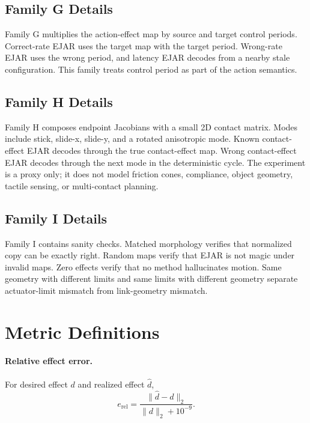 \documentclass{article}
\begin{document}
\subsection{Family G Details}

Family G multiplies the action-effect map by source and target control periods. Correct-rate EJAR uses the target map with the target period. Wrong-rate EJAR uses the wrong period, and latency EJAR decodes from a nearby stale configuration. This family treats control period as part of the action semantics.

\subsection{Family H Details}

Family H composes endpoint Jacobians with a small 2D contact matrix. Modes include stick, slide-x, slide-y, and a rotated anisotropic mode. Known contact-effect EJAR decodes through the true contact-effect map. Wrong contact-effect EJAR decodes through the next mode in the deterministic cycle. The experiment is a proxy only; it does not model friction cones, compliance, object geometry, tactile sensing, or multi-contact planning.

\subsection{Family I Details}

Family I contains sanity checks. Matched morphology verifies that normalized copy can be exactly right. Random maps verify that EJAR is not magic under invalid maps. Zero effects verify that no method hallucinates motion. Same geometry with different limits and same limits with different geometry separate actuator-limit mismatch from link-geometry mismatch.

\clearpage
\section{Metric Definitions}

\paragraph{Relative effect error.}
For desired effect $d$ and realized effect $\hat{d}$,
\begin{equation}
e_{\mathrm{rel}}=\frac{\|\hat{d}-d\|_2}{\|d\|_2+10^{-9}}.
\end{equation}
\end{document}
